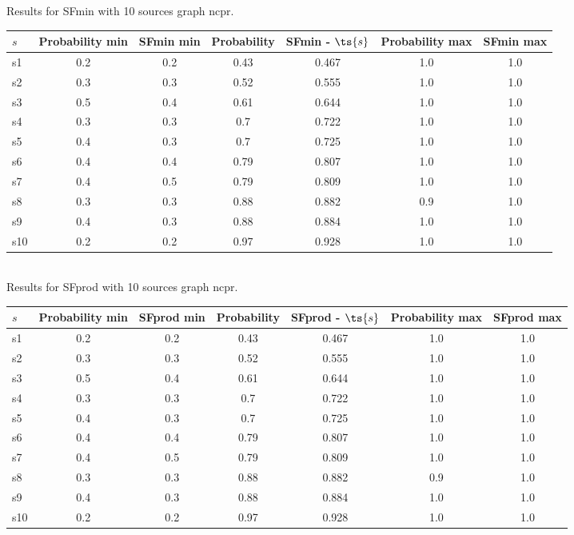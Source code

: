 \documentclass{article}
\begin{document}
\noindent Results for SFmin with 10 sources graph ncpr.

\noindent\begin{tabular}{|l|c|c|c|c|c|c|}
\hline
$s$& Probability min & SFmin min & Probability & SFmin - $\ts{s}$ & Probability max & SFmin max\\
\hline
s1 &0.2 & 0.2 & 0.43 & 0.467 & 1.0 & 1.0\\
\hline
s2 &0.3 & 0.3 & 0.52 & 0.555 & 1.0 & 1.0\\
\hline
s3 &0.5 & 0.4 & 0.61 & 0.644 & 1.0 & 1.0\\
\hline
s4 &0.3 & 0.3 & 0.7 & 0.722 & 1.0 & 1.0\\
\hline
s5 &0.4 & 0.3 & 0.7 & 0.725 & 1.0 & 1.0\\
\hline
s6 &0.4 & 0.4 & 0.79 & 0.807 & 1.0 & 1.0\\
\hline
s7 &0.4 & 0.5 & 0.79 & 0.809 & 1.0 & 1.0\\
\hline
s8 &0.3 & 0.3 & 0.88 & 0.882 & 0.9 & 1.0\\
\hline
s9 &0.4 & 0.3 & 0.88 & 0.884 & 1.0 & 1.0\\
\hline
s10 &0.2 & 0.2 & 0.97 & 0.928 & 1.0 & 1.0\\
\hline
\end{tabular}\\

\noindent Results for SFprod with 10 sources graph ncpr.

\noindent\begin{tabular}{|l|c|c|c|c|c|c|}
\hline
$s$& Probability min & SFprod min & Probability & SFprod - $\ts{s}$ & Probability max & SFprod max\\
\hline
s1 &0.2 & 0.2 & 0.43 & 0.467 & 1.0 & 1.0\\
\hline
s2 &0.3 & 0.3 & 0.52 & 0.555 & 1.0 & 1.0\\
\hline
s3 &0.5 & 0.4 & 0.61 & 0.644 & 1.0 & 1.0\\
\hline
s4 &0.3 & 0.3 & 0.7 & 0.722 & 1.0 & 1.0\\
\hline
s5 &0.4 & 0.3 & 0.7 & 0.725 & 1.0 & 1.0\\
\hline
s6 &0.4 & 0.4 & 0.79 & 0.807 & 1.0 & 1.0\\
\hline
s7 &0.4 & 0.5 & 0.79 & 0.809 & 1.0 & 1.0\\
\hline
s8 &0.3 & 0.3 & 0.88 & 0.882 & 0.9 & 1.0\\
\hline
s9 &0.4 & 0.3 & 0.88 & 0.884 & 1.0 & 1.0\\
\hline
s10 &0.2 & 0.2 & 0.97 & 0.928 & 1.0 & 1.0\\
\hline
\end{tabular}\\
\end{document}
